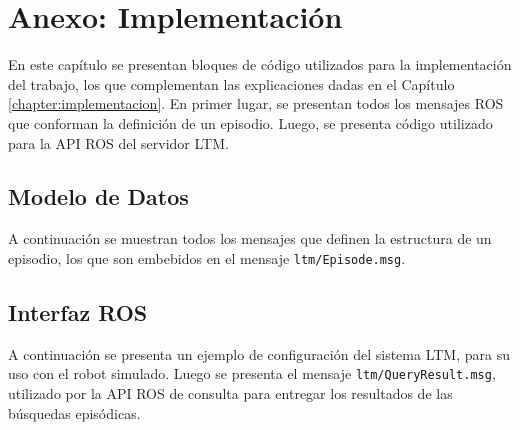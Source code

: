\chapter{Anexo: Implementación}\label{chapter:appendix_b}

En este capítulo se presentan bloques de código utilizados para la implementación del trabajo, los que complementan las explicaciones dadas en el Capítulo \ref{chapter:implementacion}. En primer lugar, se presentan todos los mensajes ROS que conforman la definición de un episodio. Luego, se presenta código utilizado para la API ROS del servidor LTM.

\section{Modelo de Datos}\label{appendixB:modelo_datos}

A continuación se muestran todos los mensajes que definen la estructura de un episodio, los que son embebidos en el mensaje \texttt{ltm/Episode.msg}.


\lstset{style=/Style/ROS/MSG}











\section{Interfaz ROS}\label{appendixB:interfazROS}

A continuación se presenta un ejemplo de configuración del sistema LTM, para su uso con el robot simulado. Luego se presenta el mensaje \texttt{ltm/QueryResult.msg}, utilizado por la API ROS de consulta para entregar los resultados de las búsquedas episódicas.

\lstset{style=/Style/yaml/ROS}


\lstset{style=/Style/ROS/MSG}

